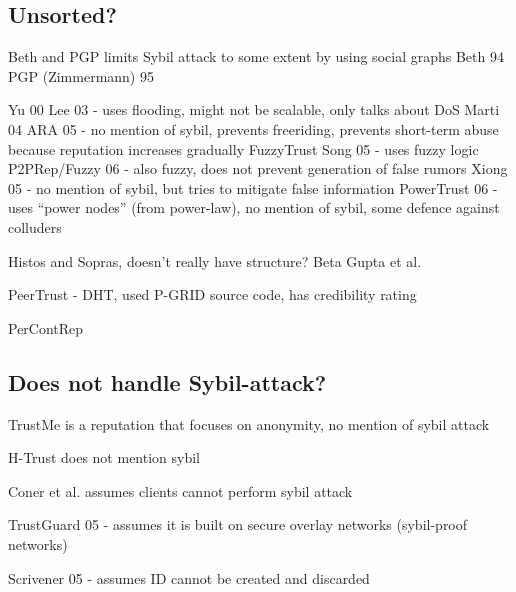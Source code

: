 \subsection{Unsorted?}

Beth and PGP limits Sybil attack to some extent by using social graphs
Beth 94\cite{beth1994valuation}
PGP (Zimmermann) 95\cite{zimmermann1995official}

Yu 00\cite{yu2000social}
Lee 03\cite{lee2003cooperative} - uses flooding, might not be scalable, only talks about DoS
Marti 04\cite{marti2004limited}
ARA 05\cite{ham2005ara} - no mention of sybil, prevents freeriding, prevents short-term abuse because reputation increases gradually
FuzzyTrust Song 05\cite{song2005trusted} - uses fuzzy logic
P2PRep/Fuzzy 06\cite{aringhieri2006fuzzy} - also fuzzy, does not prevent generation of false rumors
Xiong 05\cite{xiong2007countering} - no mention of sybil, but tries to mitigate false information
PowerTrust 06\cite{zhou2007powertrust} - uses ``power nodes'' (from power-law), no mention of sybil, some defence against colluders

Histos and Sopras\cite{zacharia2000collaborative}, doesn't really have structure?
Beta\cite{jsang2002beta}
Gupta et al.\cite{gupta2003reputation}

PeerTrust\cite{xiong2004peertrust} - DHT, used P-GRID source code, has credibility rating

PerContRep\cite{yan2014percontrep}


\subsection{Does not handle Sybil-attack?}
TrustMe\cite{singh2003trustme} is a reputation that focuses on anonymity, no mention of sybil attack

H-Trust\cite{zhao2009htrust} does not mention sybil

Coner et al.\cite{conner2009trust} assumes clients cannot perform sybil attack

TrustGuard 05\cite{srivatsa2005trustguard} - assumes it is built on secure overlay networks (sybil-proof networks)

Scrivener 05\cite{nandi2005scrivener} - assumes ID cannot be created and discarded

